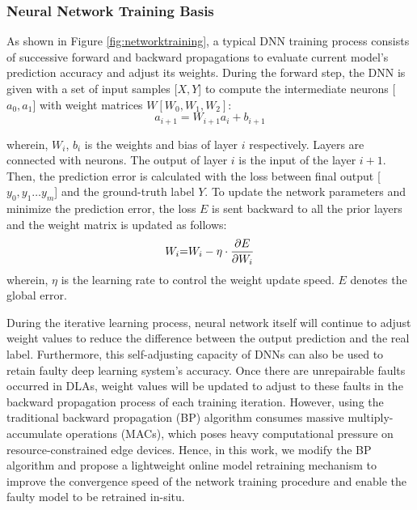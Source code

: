 \subsubsection{Neural Network Training Basis}
As shown in Figure \ref{fig:networktraining}, a typical DNN training process consists of successive forward and backward propagations to evaluate current model's prediction accuracy and adjust its weights. During the forward step, the DNN is given with a set of input samples [$X,Y$] to compute the intermediate neurons [${a_0},{a_1}$] with weight matrices $W[{W_0},{W_1},{W_2}]$: 
\begin{equation}
    {a_{i + 1}} = {W_{i+1}}{a_i} + {b_{i+1}}
\end{equation}

wherein, $W_i$, $b_i$ is the weights and bias of layer $i$ respectively. Layers are connected with neurons. The output of layer $i$ is the input of the layer $i+1$. Then, the prediction error is calculated with the loss between final output  [${y_0},{y_1} \ldots {y_m}$] and the ground-truth label $Y$. To update the network parameters and minimize the prediction error, the loss $E$ is sent backward to all the prior layers and the weight matrix is updated as follows: 
\begin{equation}
    {W_i}{\rm{ = }} {W_i} - \eta \cdot \frac{{\partial E}}{{\partial {W_i}}}
    \label{eq:backforward}
\end{equation}
wherein, $\eta $ is the learning rate to control the  weight update speed. $E$ denotes the global error.  


During the iterative learning process, neural network itself will continue to adjust weight values to reduce the difference between the output prediction and the real label. Furthermore, this self-adjusting capacity of DNNs can also be used to retain faulty deep learning system's accuracy. Once there are unrepairable faults occurred in DLAs, weight values will be updated to adjust to these faults in the backward propagation process of each training iteration. However, using the traditional backward propagation (BP) algorithm consumes massive multiply-accumulate operations (MACs), which poses heavy computational pressure on resource-constrained edge devices. Hence, in this work, we modify the BP algorithm and propose a lightweight online model retraining mechanism to improve the convergence speed of the network training procedure and enable the faulty model to be retrained in-situ.

